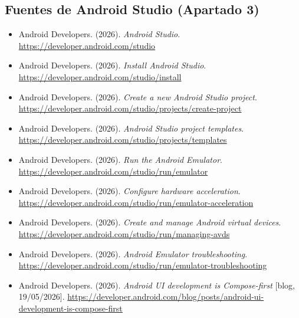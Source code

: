 \documentclass[11pt,a4paper]{article}
\begin{document}
	\subsection*{Fuentes de Android Studio (Apartado 3)}
	{\footnotesize
		\begin{itemize}[leftmargin=*,itemsep=0.02em,topsep=0.1em,label={}]
			\item Android Developers. (2026). \emph{Android Studio}. \url{https://developer.android.com/studio}
			\item Android Developers. (2026). \emph{Install Android Studio}. \url{https://developer.android.com/studio/install}
			\item Android Developers. (2026). \emph{Create a new Android Studio project}. \url{https://developer.android.com/studio/projects/create-project}
			\item Android Developers. (2026). \emph{Android Studio project templates}. \url{https://developer.android.com/studio/projects/templates}
			\item Android Developers. (2026). \emph{Run the Android Emulator}. \url{https://developer.android.com/studio/run/emulator}
			\item Android Developers. (2026). \emph{Configure hardware acceleration}. \url{https://developer.android.com/studio/run/emulator-acceleration}
			\item Android Developers. (2026). \emph{Create and manage Android virtual devices}. \url{https://developer.android.com/studio/run/managing-avds}
			\item Android Developers. (2026). \emph{Android Emulator troubleshooting}. \url{https://developer.android.com/studio/run/emulator-troubleshooting}
			\item Android Developers. (2026). \emph{Android UI development is Compose-first} [blog, 19/05/2026]. \url{https://developer.android.com/blog/posts/android-ui-development-is-compose-first}
		\end{itemize}
	}
	
\end{document}
